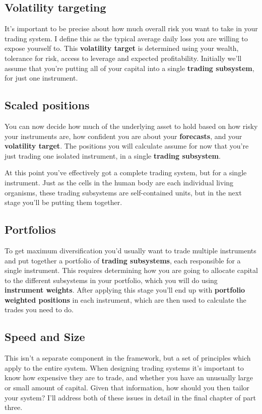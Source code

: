 \subsection*{Volatility targeting}

It's important to be precise about how much overall risk you want to take in your trading system. I define this as the typical average daily loss you are willing to expose yourself to. This \textbf{volatility target} is determined using your wealth, tolerance for risk, access to leverage and expected profitability. Initially we'll assume that you're putting all of your capital into a single \textbf{trading subsystem}, for just one instrument.

\subsection*{Scaled positions}

You can now decide how much of the underlying asset to hold based on how risky your instruments are, how confident you are about your \textbf{forecasts}, and your \textbf{volatility target}. The positions you will calculate assume for now that you're just trading one isolated instrument, in a single \textbf{trading subsystem}.

At this point you've effectively got a complete trading system, but for a single instrument. Just as the cells in the human body are each individual living organisms, these trading subsystems are self-contained units, but in the next stage you'll be putting them together.

\subsection*{Portfolios}

To get maximum diversification you'd usually want to trade multiple instruments and put together a portfolio of \textbf{trading subsystems}, each responsible for a single instrument. This requires determining how you are going to allocate capital to the different subsystems in your portfolio, which you will do using \textbf{instrument weights}. After applying this stage you'll end up with \textbf{portfolio weighted positions} in each instrument, which are then used to calculate the trades you need to do.

\subsection*{Speed and Size}

This isn't a separate component in the framework, but a set of principles which apply to the entire system. When designing trading systems it's important to know how expensive they are to trade, and whether you have an unusually large or small amount of capital. Given that information, how should you then tailor your system? I'll address both of these issues in detail in the final chapter of part three.
